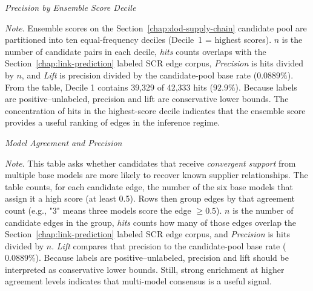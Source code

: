 \begin{table}[tbp]
  \centering
  \caption[\textit{Precision by Ensemble Score Decile}]{\textit{Precision by Ensemble Score Decile}}
  \label{tab:ch3_score_deciles}

     \begin{adjustbox}{max width=\linewidth}
    
  \end{adjustbox}

  \captionsetup{justification=raggedright,singlelinecheck=false}
  \caption*{\footnotesize \textit{Note}. Ensemble scores on the Section~\ref{chap:dod-supply-chain} candidate pool are partitioned into ten equal-frequency deciles (Decile~1 = highest scores). $n$ is the number of candidate pairs in each decile, \emph{hits} counts overlaps with the Section~\ref{chap:link-prediction} labeled SCR edge corpus, \emph{Precision} is hits divided by $n$, and \emph{Lift} is precision divided by the candidate-pool base rate ($0.0889\%$). From the table, Decile 1 contains 39{,}329 of 42{,}333 hits ($92.9\%$). Because labels are positive--unlabeled, precision and lift are conservative lower bounds. The concentration of hits in the highest-score decile indicates that the ensemble score provides a useful ranking of edges in the inference regime.}
\end{table}

\begin{table}[tbp]
  \centering
  \caption[\textit{Model agreement and precision}]
          {\textit{Model Agreement and Precision}}
  \label{tab:ch3_model_agreement}

  \begin{adjustbox}{max width=\linewidth}
    
  \end{adjustbox}

  \captionsetup{justification=raggedright,singlelinecheck=false}
  \caption*{\footnotesize \textit{Note}. This table asks whether candidates that receive \emph{convergent support} from multiple base models are more likely to recover known supplier relationships. The table counts, for each candidate edge, the number of the six base models that assign it a high score (at least 0.5). Rows then group edges by that agreement count (e.g., "3" means three models score the edge $\geq 0.5$). $n$ is the number of candidate edges in the group, \emph{hits} counts how many of those edges overlap the Section~\ref{chap:link-prediction} labeled SCR edge corpus, and \emph{Precision} is hits divided by $n$. \emph{Lift} compares that precision to the candidate-pool base rate ($0.0889\%$). Because labels are positive--unlabeled, precision and lift should be interpreted as conservative lower bounds. Still, strong enrichment at higher agreement levels indicates that multi-model consensus is a useful signal.}
\end{table}

